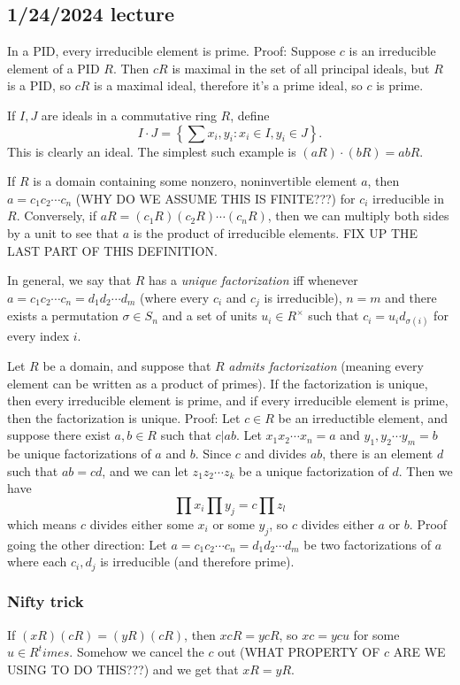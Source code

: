 \documentclass[12pt]{article}
\begin{document}
\subsection{1/24/2024 lecture}
In a PID, every irreducible element is prime. Proof: Suppose $c$ is an irreducible element of a PID $R$. Then $cR$ is maximal in the set of all principal ideals, but $R$ is a PID, so $cR$ is a maximal ideal, therefore it's a prime ideal, so $c$ is prime.
\par
If $I,J$ are ideals in a commutative ring $R$, define
\[ I \cdot J = \left\{ \sum x_i, y_i : x_i \in I, y_i \in J \right\}. \]
This is clearly an ideal. The simplest such example is $(aR)\cdot (bR)=abR$.
\par
If $R$ is a domain containing some nonzero, noninvertible element $a$, then $a=c_1 c_2 \cdots c_n$ (WHY DO WE ASSUME THIS IS FINITE???) for $c_i$ irreducible in $R$. Conversely, if $aR=(c_1 R) (c_2 R) \cdots (c_n R)$, then we can multiply both sides by a unit to see that $a$ is the product of irreducible elements. FIX UP THE LAST PART OF THIS DEFINITION.
\par
In general, we say that $R$ has a \textit{unique factorization} iff whenever $a = c_1 c_2 \cdots c_n = d_1 d_2 \cdots d_m$ (where every $c_i$ and $c_j$ is irreducible), $n=m$ and there exists a permutation $\sigma \in S_n$ and a set of units $u_i \in R^\times$ such that $c_i = u_i d_{\sigma(i)}$ for every index $i$.
\par
Let $R$ be a domain, and suppose that $R$ \textit{admits factorization} (meaning every element can be written as a product of primes). If the factorization is unique, then every irreducible element is prime, and if every irreducible element is prime, then the factorization is unique. Proof: Let $c \in R$ be an irreductible element, and suppose there exist $a,b \in R$ such that $c|ab$. Let $x_1 x_2 \cdots x_n = a$ and $y_1, y_2 \cdots y_m = b$ be unique factorizations of $a$ and $b$. Since $c$ and divides $ab$, there is an element $d$ such that $ab=cd$, and we can let $z_1 z_2 \cdots z_k$ be a unique factorization of $d$. Then we have
\[ \prod x_i \prod y_j = c \prod z_l \]
which means $c$ divides either some $x_i$ or some $y_j$, so $c$ divides either $a$ or $b$. Proof going the other direction: Let $a=c_1 c_2 \cdots c_n = d_1 d_2 \cdots d_m$ be two factorizations of $a$ where each $c_i, d_j$ is irreducible (and therefore prime).

\subsubsection{Nifty trick}
If $(xR)(cR)=(yR)(cR)$, then $xcR=ycR$, so $xc=ycu$ for some $u \in R^times$. Somehow we cancel the $c$ out (WHAT PROPERTY OF $c$ ARE WE USING TO DO THIS???) and we get that $xR=yR$.
\end{document}
